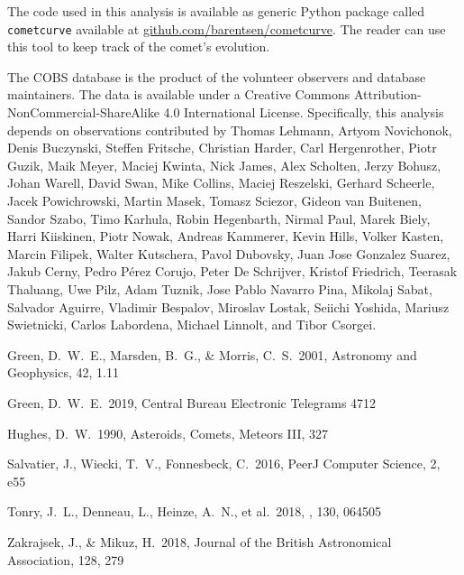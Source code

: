 \documentclass[RNAAS]{aastex63}
\begin{document}
The code used in this analysis is available as generic Python package called \texttt{cometcurve} available at \url{github.com/barentsen/cometcurve}. The reader can use this tool to keep track of the comet's evolution.



\acknowledgments

The COBS database is the product of the volunteer observers and database maintainers.
The data is available under a Creative Commons Attribution-NonCommercial-ShareAlike 4.0 International License.
Specifically, this analysis depends on observations contributed by
Thomas Lehmann, Artyom Novichonok, Denis Buczynski, Steffen Fritsche, Christian Harder, Carl Hergenrother, Piotr Guzik, Maik Meyer, Maciej Kwinta, Nick James, Alex Scholten, Jerzy Bohusz, Johan Warell, David Swan, Mike Collins, Maciej Reszelski, Gerhard Scheerle, Jacek Powichrowski, Martin Masek, Tomasz Sciezor, Gideon van Buitenen, Sandor Szabo, Timo Karhula, Robin Hegenbarth, Nirmal Paul, Marek Biely, Harri Kiiskinen, Piotr Nowak, Andreas Kammerer, Kevin Hills, Volker Kasten, Marcin Filipek, Walter Kutschera, Pavol Dubovsky, Juan Jose Gonzalez Suarez, Jakub Cerny, Pedro Pérez Corujo, Peter De Schrijver, Kristof Friedrich, Teerasak Thaluang, Uwe Pilz, Adam Tuznik, Jose Pablo Navarro Pina, Mikolaj Sabat, Salvador Aguirre, Vladimir Bespalov, Miroslav Lostak, Seiichi Yoshida, Mariusz Swietnicki, Carlos Labordena, Michael Linnolt, and Tibor Csorgei.

\begin{thebibliography}{}

 Green, D.~W.~E., Marsden, B.~G., \& Morris, C.~S.\ 2001, Astronomy and Geophysics, 42, 1.11

 Green, D.~W.~E.\ 2019, Central Bureau Electronic Telegrams 4712

 Hughes, D.~W.\ 1990, Asteroids, Comets, Meteors III, 327

Salvatier, J., Wiecki, T.~V., Fonnesbeck, C.\ 2016, PeerJ Computer Science, 2, e55

 Tonry, J.~L., Denneau, L., Heinze, A.~N., et al.\ 2018, \pasp, 130, 064505

 Zakrajsek, J., \& Mikuz, H.\ 2018, Journal of the British Astronomical Association, 128, 279

\end{thebibliography}
\end{document}
